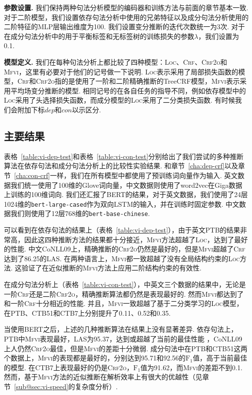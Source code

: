 \noindent\textbf{参数设置.}
我们保持两种句法分析模型的编码器和训练方法与前面的章节基本一致.
对于二阶模型，我们设置依存句法分析中使用的兄弟特征以及成分句法分析使用的二阶特征的MLP层输出维度为100.
我们设置变分推断的迭代次数统一为3次.
对于在成分句法分析中的用于平衡标签和无标签树的训练损失的参数$\lambda$，我们设置为0.1.

\noindent\textbf{模型定义.}
我们在每种句法分析上都比较了四种模型：\textsc{Loc}、\textsc{Crf}、\textsc{Crf2o}和\textsc{Mfvi}，这里有必要对于他们的记号做一下说明.
\textsc{Loc}表示采用了局部损失函数的模型，\textsc{Crf}和\textsc{Crf2o}指的是使用了一阶和二阶精确推断的TreeCRF模型，\textsc{Mfvi}表示采用平均场变分推断的模型.
相同记号的在各自任务的指导不同，例如依存模型中的\textsc{Loc}采用了头选择损失函数，而成分模型的\textsc{Loc}采用了二分类损失函数.
有时候我们会附加下标$dep$和$con$以示区分.



\subsection{主要结果}
表格~\ref{table:vi-dep-test}和表格~\ref{table:vi-con-test}分别给出了我们尝试的多种推断算法在依存句法和成分句法分析上的比较性实验结果.
和章节~\ref{cha:dep-crf}以及章节~\ref{cha:con-crf}一样，我们在所有模型中都使用了预训练词向量作为输入.
英文数据我们统一使用了100维的Glove词向量，中文数据则使用了word2vec在Giga数据上训练的100维词向.
我们还汇报了BERT的结果，对于英文数据，我们使用了24层1024维的\texttt{bert-large-cased}作为双向LSTM的输入，并在训练时固定参数.
中文数据我们则使用了12层768维的\texttt{bert-base-chinese}.

可以看到在依存句法的结果上（表格~\ref{table:vi-dep-test}），由于英文PTB的结果非常高，因此这四种推断方法的结果都十分接近，\textsc{Mfvi}方法超越了\textsc{Loc}，达到了最好的性能.
中文CoNLL09上，精确推断的\textsc{Crf2o}仍然是最好的，但是\textsc{Mfvi}超越了\textsc{Crf}达到了86.25的LAS.
在两种语言上，\textsc{Mfvi}都一致超越了没有全局结构约束的\textsc{Loc}方法.
这验证了在近似推断的\textsc{Mfvi}方法上应用二阶结构约束的有效性.



在成分句法分析上（表格~\ref{table:vi-con-test}），中英文三个数据的结果中，无论是一阶\textsc{Crf}还是二阶\textsc{Crf2o}，精确推断算法都仍然是表现最好的.
然而\textsc{Mfvi}都达到了和一阶\textsc{Crf}十分相近的性能.
并且，\textsc{Mfvi}一致超越了基于二分类学习的\textsc{Loc}模型，在PTB、CTB51和CTB7上分别提升了0.11、0.52和0.35.

当使用BERT之后，上述的几种推断算法在结果上没有显著差异.
依存句法上，PTB中\textsc{Mfvi}表现最好，LAS为95.37，达到或超越了当前的最佳性能 \citep{zhou-zhao-2019-head,wang-tu-2020-second}，CoNLL09上人仍然\textsc{Crf2o}最佳，但是\textsc{Mfvi}的差距十分微弱.
成分句法中在PTB和CTB51这两个数据上，\textsc{Mfvi}的表现都是最好的，分别达到95.71和92.56的$\mathrm{F}_1$值，高于当前最佳的模型\citep{kitaev-etal-2019-multilingual}.
在CTB7上表现最好的仍是\textsc{Crf2o}，$\mathrm{F}_1$值为91.62，而\textsc{Mfvi}的差距不到0.1.
然而，基于\textsc{Mfvi}方法的近似推断在解析效率上有很大的优越性（见章节~\ref{sub@sec:vi-speed}的复杂度分析）.

